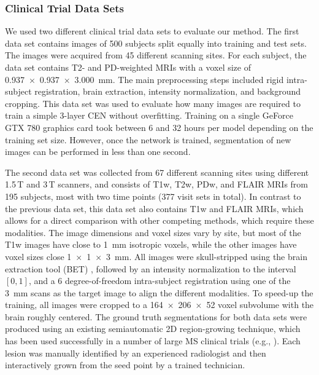 \subsubsection{Clinical Trial Data Sets}

We used two different clinical trial data sets to evaluate our method. The first
data set contains images of 500 subjects split equally into training and test
sets. The images were acquired from 45 different scanning sites. For each
subject, the data set contains T2- and PD-weighted MRIs with a voxel size of
\SI{0.937x0.937x3.000}{\milli\metre}. The main preprocessing steps included
rigid intra-subject registration, brain extraction, intensity normalization, and
background cropping. This data set was used to evaluate how many images are
required to train a simple 3-layer CEN without overfitting. Training on a
single GeForce GTX 780 graphics card took between 6 and 32 hours per model
depending on the training set size. However, once the network is trained,
segmentation of new images can be performed in less than one second.

The second data set was collected from 67 different scanning sites using
different 1.5\,T and 3\,T scanners, and consists of T1w, T2w, PDw, and FLAIR
MRIs from 195 subjects, most with two time points (377 visit sets in total). In
contrast to the previous data set, this data set also contains T1w and FLAIR
MRIs, which allows for a direct comparison with other competing methods, which
require these modalities. The image dimensions and voxel sizes vary by site, but
most of the T1w images have close to \SI{1}{\milli\meter} isotropic voxels,
while the other images have voxel sizes close \SI{1x1x3}{\milli\meter}. All
images were skull-stripped using the brain extraction tool (BET)
\citep{jenkinson2005bet2}, followed by an intensity normalization to the
interval $[0,1]$, and a 6 degree-of-freedom intra-subject registration using one
of the \SI{3}{\milli\meter} scans as the target image to align the different
modalities. To speed-up the training, all images were cropped to a
\num{164x206x52} voxel subvolume with the brain roughly centered. The ground
truth segmentations for both data sets were produced using an existing
semiautomatic 2D region-growing technique, which has been used successfully in a
number of large MS clinical trials (e.g.,
\citealp{kappos2006long,traboulsee2008reduction}).
Each lesion was manually identified by an experienced radiologist and then
interactively grown from the seed point by a trained technician.

